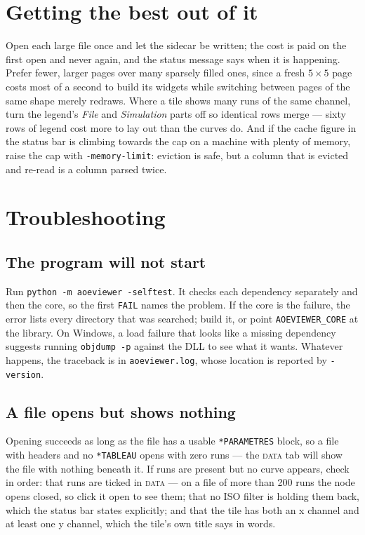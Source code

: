 \documentclass[11pt,a4paper,oneside]{report}
\newcommand{\code}[1]{\texttt{#1}}
\newcommand{\tab}[1]{\textsc{#1}}
\begin{document}
\section{Getting the best out of it}

Open each large file once and let the sidecar be written; the cost is paid on
the first open and never again, and the status message says when it is
happening. Prefer fewer, larger pages over many sparsely filled ones, since a
fresh $5 \times 5$ page costs most of a second to build its widgets while
switching between pages of the same shape merely redraws. Where a tile shows
many runs of the same channel, turn the legend's \emph{File} and
\emph{Simulation} parts off so identical rows merge --- sixty rows of legend
cost more to lay out than the curves do. And if the cache figure in the status
bar is climbing towards the cap on a machine with plenty of memory, raise the
cap with \code{-memory-limit}: eviction is safe, but a column that is evicted
and re-read is a column parsed twice.

\section{Troubleshooting}

\subsection{The program will not start}

Run \code{python -m aoeviewer -selftest}. It checks each dependency separately
and then the core, so the first \code{FAIL} names the problem. If the core is
the failure, the error lists every directory that was searched; build it, or
point \code{AOEVIEWER\_CORE} at the library. On Windows, a load failure that
looks like a missing dependency suggests running \code{objdump -p} against the
DLL to see what it wants. Whatever happens, the traceback is in
\code{aoeviewer.log}, whose location is reported by \code{-version}.

\subsection{A file opens but shows nothing}

Opening succeeds as long as the file has a usable \code{*PARAMETRES} block, so a
file with headers and no \code{*TABLEAU} opens with zero runs --- the
\tab{data} tab will show the file with nothing beneath it. If runs are present
but no curve appears, check in order: that runs are ticked in \tab{data} --- on
a file of more than 200 runs the node opens closed, so click it open to see
them; that no ISO filter is holding them back, which the status bar states
explicitly; and that the tile has both an x channel and at least one y channel,
which the tile's own title says in words.
\end{document}
